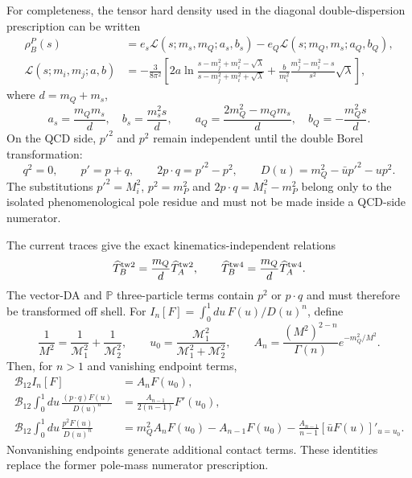 \documentclass[11pt]{article}
\begin{document}
For completeness, the tensor hard density used in the diagonal
double-dispersion prescription can be written
\begin{align}
 \rho_B^P(s)&=e_s\mathcal L(s;m_s,m_Q;a_s,b_s)
              -e_Q\mathcal L(s;m_Q,m_s;a_Q,b_Q),\nonumber\\
 \mathcal L(s;m_i,m_j;a,b)&=-\frac{3}{8\pi^2}\left[
 2a\ln\frac{s-m_j^2+m_i^2-\sqrt{\lambda}}
 {s-m_j^2+m_i^2+\sqrt{\lambda}}
 +\frac{b}{m_i^2}\frac{m_j^2-m_i^2-s}{s^2}\sqrt{\lambda}\right],
 \label{eq:app-rho-b}
\end{align}
where $d=m_Q+m_s$,
\begin{equation}
 a_s=\frac{m_Qm_s}{d},\quad b_s=\frac{m_s^2s}{d},\qquad
 a_Q=\frac{2m_Q^2-m_Qm_s}{d},\quad b_Q=-\frac{m_Q^2s}{d}.
\end{equation}
On the QCD side, $p'^2$ and $p^2$ remain independent until the double Borel
transformation:
\begin{equation}
 q^2=0,\qquad p'=p+q,\qquad
 2p\cdot q=p'^2-p^2,\qquad
 D(u)=m_Q^2-\bar u p'^2-up^2 .
 \label{eq:app-offshell-kinematics}
\end{equation}
The substitutions $p'^2=M_i^2$, $p^2=m_P^2$ and
$2p\cdot q=M_i^2-m_P^2$ belong only to the isolated phenomenological pole
residue and must not be made inside a QCD-side numerator.

The current traces give the exact kinematics-independent relations
\begin{equation}
 \widehat T_B^{\rm tw2}
 =\frac{m_Q}{d}\widehat T_A^{\rm tw2},\qquad
 \widehat T_B^{\rm tw4}
 =\frac{m_Q}{d}\widehat T_A^{\rm tw4}.
 \label{eq:app-tensor-safe-ratios}
\end{equation}
The vector-DA and $\mathbb P$ three-particle terms contain
$p^2$ or $p\cdot q$ and must therefore be transformed off shell.  For
$I_n[F]=\int_0^1du\,F(u)/D(u)^n$, define
\begin{equation}
 \frac1{M^2}=\frac1{\mathcal M_1^2}+\frac1{\mathcal M_2^2},\qquad
 u_0=\frac{\mathcal M_1^2}{\mathcal M_1^2+\mathcal M_2^2},\qquad
 A_n=\frac{(M^2)^{2-n}}{\Gamma(n)}e^{-m_Q^2/M^2}.
\end{equation}
Then, for $n>1$ and vanishing endpoint terms,
\begin{align}
 \mathcal B_{12} I_n[F]&=A_nF(u_0),\nonumber\\
 \mathcal B_{12}\!\int_0^1du\,\frac{(p\cdot q)F(u)}{D(u)^n}
 &=\frac{A_{n-1}}{2(n-1)}F'(u_0),\nonumber\\
 \mathcal B_{12}\!\int_0^1du\,\frac{p^2F(u)}{D(u)^n}
 &=m_Q^2A_nF(u_0)-A_{n-1}F(u_0)
 -\frac{A_{n-1}}{n-1}[\bar uF(u)]'_{u=u_0}.
 \label{eq:app-borel-numerators}
\end{align}
Nonvanishing endpoints generate additional contact terms.  These identities
replace the former pole-mass numerator prescription.
\end{document}
